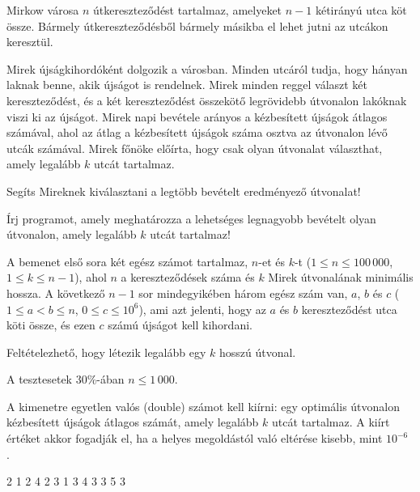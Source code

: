 





Mirkow városa $n$ útkereszteződést tartalmaz, amelyeket $n-1$ kétirányú utca köt össze. Bármely út\-ke\-resz\-te\-ző\-dés\-ből bármely másikba el lehet jutni az utcákon keresztül.

Mirek újságkihordóként dolgozik a városban. Minden utcáról tudja, hogy hányan laknak benne, akik újságot is rendelnek. Mirek minden reggel választ két kereszteződést, és a két kereszteződést összekötő legrövidebb útvonalon lakóknak viszi ki az újságot. Mirek napi bevétele arányos a kézbesített újságok átlagos számával, ahol az átlag a kézbesített újságok száma osztva az útvonalon lévő utcák számával. Mirek főnöke előírta, hogy csak olyan útvonalat választhat, amely legalább $k$ utcát tartalmaz.

Segíts Mireknek kiválasztani a legtöbb bevételt eredményező útvonalat!

Írj programot, amely meghatározza a lehetséges legnagyobb bevételt olyan útvonalon, amely legalább $k$ utcát tartalmaz!

A bemenet első sora két egész számot tartalmaz, $n$-et és $k$-t ($1 \le n \le 100\,000$, $1 \le k \le n - 1$), ahol $n$ a kereszteződések száma és $k$ Mirek útvonalának minimális hossza. A következő $n-1$ sor mindegyikében három egész szám van, $a$, $b$ és $c$ ($1 \le a < b \le n$, $0 \le c \le 10^6$), ami azt jelenti, hogy az $a$ és $b$ kereszteződést utca köti össze, és ezen $c$ számú újságot kell kihordani.

Feltételezhető, hogy létezik legalább egy $k$ hosszú útvonal.

A tesztesetek $30\%$-ában $n \le 1\,000$.

A kimenetre egyetlen valós (double) számot kell kiírni: egy optimális útvonalon kézbesített újságok átlagos számát, amely legalább $k$ utcát tartalmaz.
A kiírt értéket akkor fogadják el, ha a helyes megoldástól való eltérése kisebb, mint $10^{-6}$ .


 2
1 2 4
2 3 1
3 4 3
3 5 3
\sampleEND


